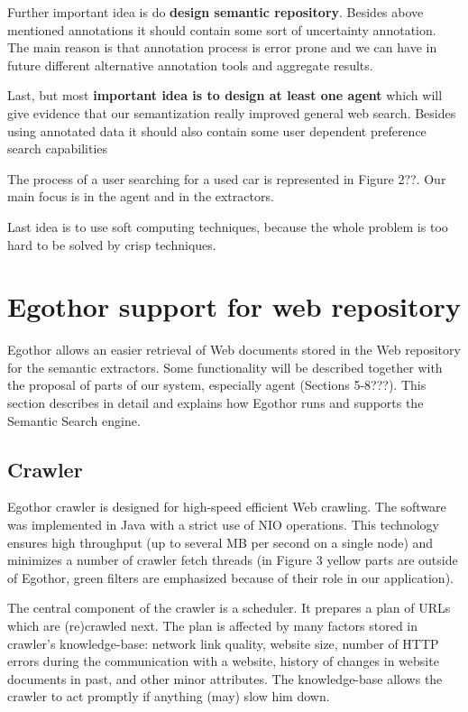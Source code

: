 \documentclass{sig-alternate}
\begin{document}
Further important idea is do \textbf{design semantic repository}. Besides above mentioned annotations it should contain some sort of uncertainty annotation. The main reason is that annotation process is error prone and we can have in future different alternative annotation tools and aggregate results. 

Last, but most \textbf{important idea is to design at least one agent} which will give evidence that our semantization really improved general web search. Besides using annotated data it should also contain some user dependent preference search capabilities

 
The process of a user searching for a used car is represented in Figure 2??. Our main focus is in the agent and in the extractors. 

Last idea is to use soft computing techniques, because the whole problem is too hard to be solved by crisp techniques. 


\section{Egothor support for web repository}
Egothor allows an easier retrieval of Web documents stored in the Web repository for the semantic extractors. Some functionality will be described together with the proposal of parts of our system, especially agent (Sections 5-8???). This section describes in detail and explains how Egothor runs and supports the Semantic Search engine.

\subsection{Crawler}

Egothor crawler is designed for high-speed efficient Web crawling. The software was implemented in Java with a strict use of NIO operations. This technology ensures high throughput (up to several MB per second on a single node) and minimizes a number of crawler fetch threads (in Figure 3 yellow parts are outside of Egothor, green filters are emphasized because of their role in our application).
 
The central component of the crawler is a scheduler. It prepares a plan of URLs which are (re)crawled next.  The plan is affected by many factors stored in crawler's knowledge-base: network link quality, website size, number of HTTP errors during the communication with a website, history of changes in website documents in past, and other minor attributes. The knowledge-base allows the crawler to act promptly if anything (may) slow him down.
\end{document}
